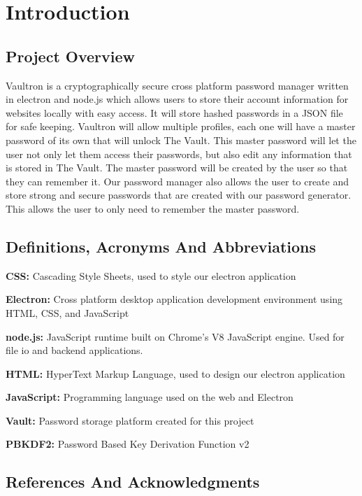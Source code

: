 \documentclass[11pt]{report}
\begin{document}
\clearpage


\tableofcontents{}

\chapter{Introduction}

\section{Project Overview}
Vaultron is a cryptographically secure cross platform password manager
written in electron and node.js which allows users to store their account
information for websites locally with easy access. It will store hashed passwords 
in a JSON file for safe keeping. Vaultron will allow multiple profiles, each one will
have a master password of its own that will unlock The Vault. This master password will 
let the user not only let them access their passwords, but also edit any information that 
is stored in The Vault. The master password will be created by the user so that they can 
remember it. Our password manager also allows the user to create and store strong and 
secure passwords that are created with our password generator. This allows the user 
to only need to remember the master password. 



\section{Definitions, Acronyms And Abbreviations}
\textbf{CSS:} Cascading Style Sheets, used to style our electron application

\textbf{Electron:} Cross platform desktop application development environment
using HTML, CSS, and JavaScript

\textbf{node.js:} JavaScript runtime built on Chrome's V8 JavaScript engine. Used
for file io and backend applications.

\textbf{HTML:} HyperText Markup Language, used to design our electron application

\textbf{JavaScript:} Programming language used on the web and Electron

\textbf{Vault:} Password storage platform created for this project

\textbf{PBKDF2:} Password Based Key Derivation Function v2


\section{References And Acknowledgments}
\end{document}
